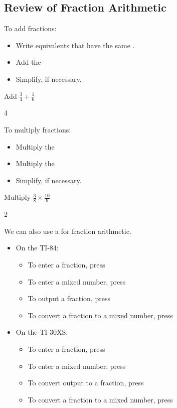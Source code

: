 \subsection{Review of Fraction Arithmetic}
To add fractions:
\begin{itemize}
\item Write equivalents that have the same \makeblank[1in].
\item Add the \makeblank[1in]
\item Simplify, if necessary.
\end{itemize}
\begin{Example}
Add $\frac{3}{4}+\frac{1}{6}$
\begin{cpic}{}{4}
\end{cpic}
\end{Example}
To multiply fractions:
\begin{itemize}
\item Multiply the \makeblank[1in]
\item Multiply the \makeblank[1in]
\item Simplify, if necessary.
\end{itemize}
\begin{Example}
Multiply $\frac{3}{8}\times\frac{10}{9}$
\begin{cpic}{}{2}
\end{cpic}
\end{Example}
We can also use a \makeblank[1in] for fraction arithmetic.
\begin{itemize}
\item On the TI-84:
\begin{itemize}
\item To enter a fraction, press \makeblank[.75in] \makeblank[.75in] \makeblank[.75in] 
\item To enter a mixed number, press \makeblank[.75in] \makeblank[.75in] \makeblank[.75in] 
\item To output a fraction, press \makeblank[.75in] \makeblank[.75in]
\item To convert a fraction to a mixed number, press \makeblank[.75in] \makeblank[.75in]
\end{itemize}
\item On the TI-30XS:
\begin{itemize}
\item To enter a fraction, press \makeblank[.75in]
\item To enter a mixed number, press \makeblank[.75in] \makeblank[.75in] 
\item To convert output to a fraction, press \makeblank[.75in] 
\item To convert a fraction to a mixed number, press \makeblank[.75in] \makeblank[.75in] 
\end{itemize}
\end{itemize}